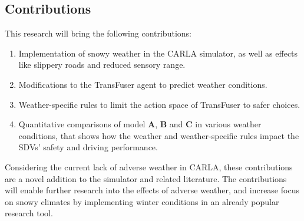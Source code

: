 \subsection*{Contributions}

This research will bring the following contributions:
\begin{enumerate}
    \item Implementation of snowy weather in the CARLA simulator, as well as effects like slippery roads and reduced sensory range.
    \item Modifications to the TransFuser agent to predict weather conditions.
    \item Weather-specific rules to limit the action space of TransFuser to safer choices.
    \item Quantitative comparisons of model \textbf{A}, \textbf{B} and \textbf{C} in various weather conditions,
    that shows how the weather and weather-specific rules impact the SDVs' safety and driving performance.
\end{enumerate}

Considering the current lack of adverse weather in CARLA,
these contributions are a novel addition to the simulator and related literature.
The contributions will enable further research into the effects of adverse weather,
and increase focus on snowy climates by implementing winter conditions in an already popular research tool.
